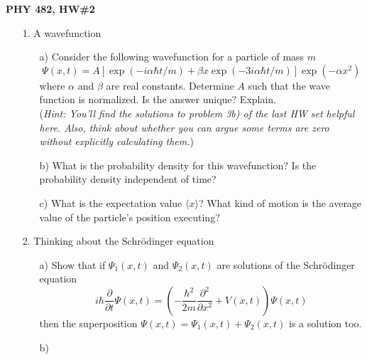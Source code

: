 \documentclass[11pt]{article}
\begin{document}
\thispagestyle{empty}


\centerline{\bf PHY 482,  HW\#2}

\begin{itemize}
%
\item[1.] A wavefunction
\begin{itemize}
\item[a)]
Consider the following wavefunction for a particle of mass $m$
\begin{equation}
\Psi(x,t) = A \left[\exp(-i\alpha\hbar t/m)+\beta x\exp(-3i\alpha\hbar t/m)\right]\exp(-\alpha x^2)
\end{equation}
where $\alpha$ and $\beta$ are real constants. Determine $A$ such that the wave function is normalized. Is the answer unique? Explain.\\
({\it Hint: You'll find the solutions to problem 3b) of the last HW set helpful here. Also, think about whether you can argue some terms are zero without explicitly calculating them.})
\item[b)]
What is the probability density for this wavefunction? Is the probability density independent of time?
\item[c)]
What is the expectation value $\langle x \rangle$? What kind of motion is the average value of the particle's position executing?
\end{itemize}
%
\item[2.] Thinking about the Schr\"odinger equation
\begin{itemize}
\item[a)]
Show that if $\Psi_1(x,t)$ and $\Psi_2(x,t)$ are solutions of the Schr\"odinger equation
\begin{equation}\label{schroed}
i\hbar \frac{\partial}{\partial t} \Psi(x,t) =
\left( -\frac{\hbar^2}{2m}\frac{\partial^2}{\partial x^2} + V(x,t) \right) \Psi(x,t)
\end{equation}
then the superposition $\Psi(x,t) = \Psi_1(x,t) + \Psi_2(x,t)$ is a solution too. 
\item[b)]

\end{itemize}
\end{itemize}
\end{document}
